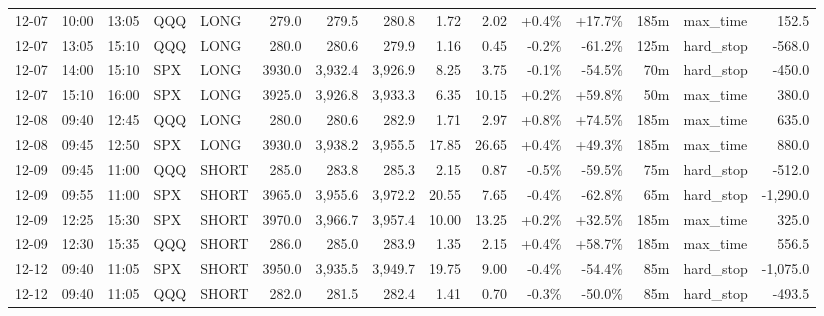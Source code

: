 \documentclass[11pt,a4paper,twoside]{article}
\begin{document}
\begin{landscape}
\begin{center}
\begin{longtable}{>{\color{txtmain}}l l l l l r r r r r r r r >{\color{txtmain}}l r}
12-07 & 10:00 & 13:05 & QQQ & LONG & 279.0 & 279.5 & 280.8 & 1.72 & 2.02 & \textcolor{wingreen}{+0.4\%} & \textcolor{wingreen}{+17.7\%} & 185m & max\_time & \textcolor{wingreen}{152.5} \\
12-07 & 13:05 & 15:10 & QQQ & LONG & 280.0 & 280.6 & 279.9 & 1.16 & 0.45 & \textcolor{lossred}{-0.2\%} & \textcolor{lossred}{-61.2\%} & 125m & hard\_stop & \textcolor{lossred}{-568.0} \\
12-07 & 14:00 & 15:10 & SPX & LONG & 3930.0 & 3,932.4 & 3,926.9 & 8.25 & 3.75 & \textcolor{lossred}{-0.1\%} & \textcolor{lossred}{-54.5\%} & 70m & hard\_stop & \textcolor{lossred}{-450.0} \\
12-07 & 15:10 & 16:00 & SPX & LONG & 3925.0 & 3,926.8 & 3,933.3 & 6.35 & 10.15 & \textcolor{wingreen}{+0.2\%} & \textcolor{wingreen}{+59.8\%} & 50m & max\_time & \textcolor{wingreen}{380.0} \\
12-08 & 09:40 & 12:45 & QQQ & LONG & 280.0 & 280.6 & 282.9 & 1.71 & 2.97 & \textcolor{wingreen}{+0.8\%} & \textcolor{wingreen}{+74.5\%} & 185m & max\_time & \textcolor{wingreen}{635.0} \\
12-08 & 09:45 & 12:50 & SPX & LONG & 3930.0 & 3,938.2 & 3,955.5 & 17.85 & 26.65 & \textcolor{wingreen}{+0.4\%} & \textcolor{wingreen}{+49.3\%} & 185m & max\_time & \textcolor{wingreen}{880.0} \\
12-09 & 09:45 & 11:00 & QQQ & SHORT & 285.0 & 283.8 & 285.3 & 2.15 & 0.87 & \textcolor{lossred}{-0.5\%} & \textcolor{lossred}{-59.5\%} & 75m & hard\_stop & \textcolor{lossred}{-512.0} \\
12-09 & 09:55 & 11:00 & SPX & SHORT & 3965.0 & 3,955.6 & 3,972.2 & 20.55 & 7.65 & \textcolor{lossred}{-0.4\%} & \textcolor{lossred}{-62.8\%} & 65m & hard\_stop & \textcolor{lossred}{-1,290.0} \\
12-09 & 12:25 & 15:30 & SPX & SHORT & 3970.0 & 3,966.7 & 3,957.4 & 10.00 & 13.25 & \textcolor{wingreen}{+0.2\%} & \textcolor{wingreen}{+32.5\%} & 185m & max\_time & \textcolor{wingreen}{325.0} \\
12-09 & 12:30 & 15:35 & QQQ & SHORT & 286.0 & 285.0 & 283.9 & 1.35 & 2.15 & \textcolor{wingreen}{+0.4\%} & \textcolor{wingreen}{+58.7\%} & 185m & max\_time & \textcolor{wingreen}{556.5} \\
12-12 & 09:40 & 11:05 & SPX & SHORT & 3950.0 & 3,935.5 & 3,949.7 & 19.75 & 9.00 & \textcolor{lossred}{-0.4\%} & \textcolor{lossred}{-54.4\%} & 85m & hard\_stop & \textcolor{lossred}{-1,075.0} \\
12-12 & 09:40 & 11:05 & QQQ & SHORT & 282.0 & 281.5 & 282.4 & 1.41 & 0.70 & \textcolor{lossred}{-0.3\%} & \textcolor{lossred}{-50.0\%} & 85m & hard\_stop & \textcolor{lossred}{-493.5} \\

\end{longtable}
\end{center}
\end{landscape}
\end{document}
